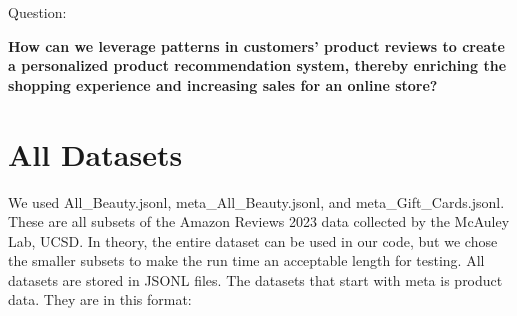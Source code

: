 \documentclass[fontsize=11pt]{article}
\begin{document}
\vspace{\baselineskip}
\noindent Question:

\textbf{How can we leverage patterns in customers' product reviews to create a personalized product recommendation system, thereby enriching the shopping experience and increasing sales for an online store?}

\section*{All Datasets}
We used All\_Beauty.jsonl, meta\_All\_Beauty.jsonl, and meta\_Gift\_Cards.jsonl.
These are all subsets of the Amazon Reviews 2023 data collected by the McAuley Lab, UCSD. In theory, the entire dataset can be used in our code, but we chose the smaller subsets to make the run time an acceptable length for testing. All datasets are stored in JSONL files.
The datasets that start with meta is product data. They are in this format:
\end{document}

